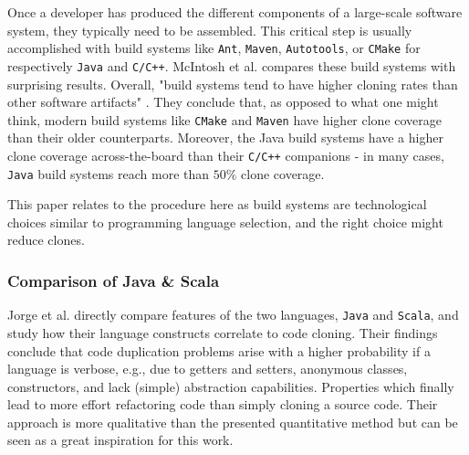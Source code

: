 Once a developer has produced the different components of a large-scale software system, they typically need to be assembled. This critical step is usually accomplished with build systems like \texttt{Ant},  \texttt{Maven}, \texttt{Autotools}, or \texttt{CMake} for respectively \texttt{Java} and \texttt{C/C++}. McIntosh et al. \cite{mcintosh2014collecting} compares these build systems with surprising results. Overall, "build systems tend to have higher cloning rates than other software artifacts" \cite{mcintosh2014collecting}. They conclude that, as opposed to what one might think, modern build systems like \texttt{CMake} and  \texttt{Maven} have higher clone coverage than their older counterparts. Moreover, the Java build systems have a higher clone coverage across-the-board than their \texttt{C/C++} companions - in many cases, \texttt{Java} build systems reach more than $50\%$ clone coverage.

This paper relates to the procedure here as build systems are technological choices similar to programming language selection, and the right choice might reduce clones.

\subsubsection{Comparison of Java \& Scala}

Jorge et al. \cite{jorge2012impact} directly compare features of the two languages, \texttt{Java} and \texttt{Scala}, and study how their language constructs correlate to code cloning. Their findings conclude that code duplication problems arise with a higher probability if a language is verbose, e.g., due to getters and setters, anonymous classes, constructors, and lack (simple) abstraction capabilities. Properties which finally lead to more effort refactoring code than simply cloning a source code. \cite{jorge2012impact}
Their approach is more qualitative than the presented quantitative method but can be seen as a great inspiration for this work.
